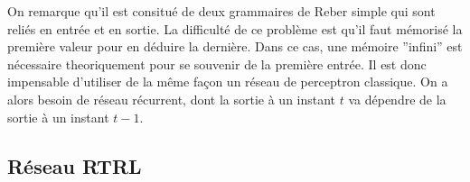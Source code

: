 On remarque qu'il est consitué de deux grammaires de Reber simple qui sont reliés en entrée et en sortie. La difficulté de ce problème est qu'il faut mémorisé la première valeur pour en déduire la dernière. Dans ce cas, une mémoire ''infini'' est nécessaire theoriquement pour se souvenir de la première entrée. Il est donc impensable d'utiliser de la même façon un réseau de perceptron classique. On a alors besoin de réseau récurrent, dont la sortie à un instant $t$ va dépendre de la sortie à un instant $t-1$.

\subsection{Réseau RTRL}
